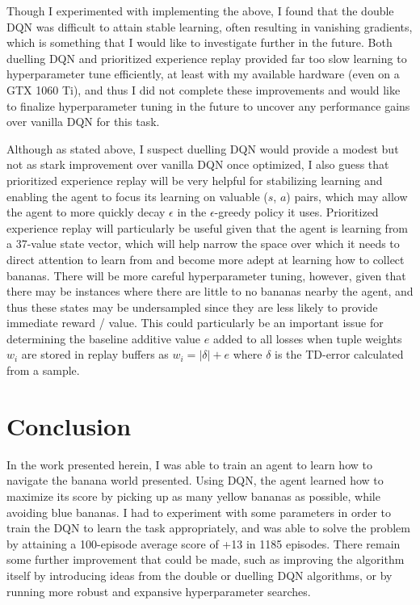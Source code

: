 \documentclass[11pt]{article}
\begin{document}
Though I experimented with implementing the above, I found that the double DQN was difficult to attain stable learning, often resulting in vanishing gradients, which is something that I would like to investigate further in the future. Both duelling DQN and prioritized experience replay provided far too slow learning to hyperparameter tune efficiently, at least with my available hardware (even on a GTX 1060 Ti), and thus I did not complete these improvements and would like to finalize hyperparameter tuning in the future to uncover any performance gains over vanilla DQN for this task.

Although as stated above, I suspect duelling DQN would provide a modest but not as stark improvement over vanilla DQN once optimized, I also guess that prioritized experience replay will be very helpful for stabilizing learning and enabling the agent to focus its learning on valuable ($s$, $a$) pairs, which may allow the agent to more quickly decay $\epsilon$ in the $\epsilon$-greedy policy it uses. Prioritized experience replay will particularly be useful given that the agent is learning from a 37-value state vector, which will help narrow the space over which it needs to direct attention to learn from and become more adept at learning how to collect bananas. There will be more careful hyperparameter tuning, however, given that there may be instances where there are little to no bananas nearby the agent, and thus these states may be undersampled since they are less likely to provide immediate reward / value. This could particularly be an important issue for determining the baseline additive value $e$ added to all losses when tuple weights $w_i$ are stored in replay buffers as $w_i = |\delta| + e$ where $\delta$ is the TD-error calculated from a sample.

\section{Conclusion}

In the work presented herein, I was able to train an agent to learn how to navigate the banana world presented. Using DQN, the agent learned how to maximize its score by picking up as many yellow bananas as possible, while avoiding blue bananas. I had to experiment with some parameters in order to train the DQN to learn the task appropriately, and was able to solve the problem by attaining a 100-episode average score of +13 in 1185 episodes. There remain some further improvement that could be made, such as improving the algorithm itself by introducing ideas from the double or duelling DQN algorithms, or by running more robust and expansive hyperparameter searches.



\end{document}
